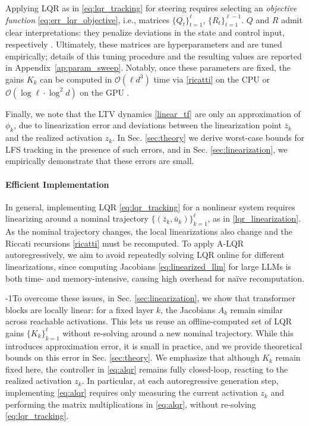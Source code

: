 \documentclass{article}
\theoremstyle{plain}
\theoremstyle{definition}
\theoremstyle{remark}
\begin{document}
Applying LQR as in \eqref{eq:lqr_tracking} for steering requires selecting an \textit{objective function} \eqref{eq:err_lqr_objective}, i.e., matrices $\{Q_t\}_{t=1}^\ell$, $\{R_t\}_{t=1}^{\ell-1}$.
$Q$ and $R$ admit clear interpretations: they penalize deviations in the state and control input, respectively \cite{lewisOptimalControlChapter2}. Ultimately, these matrices are hyperparameters and are tuned empirically; details of this tuning procedure and the resulting values are reported in Appendix~\ref{ap:param_sweep}. Notably, once these parameters are fixed, the gains $K_k$ can be computed in $\mathcal{O}(\ell d^3)$ time \cite{rawlings2020model} via \eqref{ricatti} on the CPU or $\mathcal{O}(\log \ell \cdot \log^2 d)$ on the GPU \cite{fang2026safe}.

Finally, we note that the LTV dynamics \eqref{linear_tf} are only an approximation of $\phi_k$, due to linearization error and deviations between the linearization point $\bar z_k$ and the realized activation $z_k$. In Sec. \ref{sec:theory} we derive worst-case bounds for LFS tracking in the presence of such errors, and in Sec. \ref{sec:linearization}, we empirically demonstrate that these errors are small.

\vspace{-8pt}

\paragraph{Efficient Implementation}
In general, implementing LQR \eqref{eq:lqr_tracking} for a nonlinear system requires linearizing around a nominal trajectory $\{(\bar z_k, \bar u_k)\}_{k=1}^\ell$, as in \eqref{lqr_linearization}. As the nominal trajectory changes, the local linearizations also change and the Riccati recursions \eqref{ricatti} must be recomputed. To apply A-LQR autoregressively, we aim to avoid repeatedly solving LQR online for different linearizations, since computing Jacobians \eqref{eq:linearized_llm} for large LLMs is both time- and memory-intensive, causing high overhead for na\"ive recomputation.

\looseness-1To overcome these issues, in Sec. \ref{sec:linearization}, we show that transformer blocks are locally linear: for a fixed layer $k$, the Jacobians $A_k$ remain similar across reachable activations. This lets us reuse an offline-computed set of LQR gains 
$\{K_k\}_{k=1}^\ell$ without re-solving around a new nominal trajectory. While this introduces approximation error, it is small in practice, and we provide theoretical bounds on this error in Sec. \ref{sec:theory}. We emphasize that although 
$K_k$ remain fixed here, the controller in \eqref{eq:alqr} remains fully closed-loop, reacting to the realized activation $z_k$. In particular, at each autoregressive generation step, implementing \eqref{eq:alqr} requires only measuring the current activation $z_k$ and performing the matrix multiplications in \eqref{eq:alqr}, without re-solving \eqref{eq:lqr_tracking}.
\end{document}
